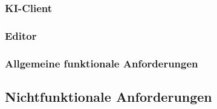 \documentclass{uulm-assignment}
\begin{document}
\clearpage
\subsubsection{KI-Client}

\subsubsection{Editor}


\clearpage
\subsubsection{Allgemeine funktionale Anforderungen}


\clearpage
\subsection{Nichtfunktionale Anforderungen}

\end{document}
